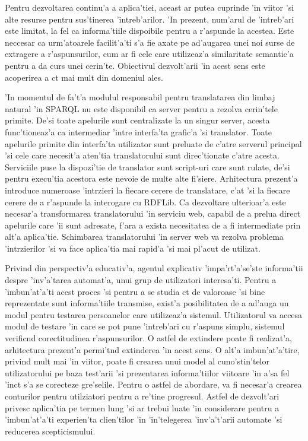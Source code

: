 \documentclass[12pt,a4paper,twoside]{report}
\begin{document}
Pentru dezvoltarea continu'a a aplica'tiei, aceast ar putea cuprinde 'in viitor 'si alte resurse pentru sus'tinerea 'intreb'arilor. 'In prezent, num'arul de 'intreb'ari este limitat, la fel ca informa'tiile dispoibile pentru a r'aspunde la acestea. Este neccesar ca urm'atoarele facilit'a'ti s'a fie axate pe ad'augarea unei noi surse de extragere a r'aspunsurilor, cum ar fi cele care utilizeaz'a similaritate semantic'a pentru a da curs unei cerin'te. Obiectivul dezvolt'arii 'in acest sens este acoperirea a c\ia t mai mult din domeniul ales.

'In momentul de fa't'a modulul responsabil pentru translatarea din limbaj natural 'in SPARQL nu este disponibil ca server pentru a rezolva cerin'tele primite. De'si toate apelurile sunt centralizate la un singur server, acesta func'tioneaz'a ca intermediar 'intre interfa'ta grafic'a 'si translator. Toate apelurile primite din interfa'ta utilizator sunt preluate de c'atre serverul principal 'si cele care necesit'a aten'tia translatorului sunt direc'tionate c'atre acesta. Serviciile puse la dispozi'tie de translator sunt script-uri care sunt rulate, de'si pentru execu'tia acestora este nevoie de multe alte fi'siere. Arhitectura prezent'a introduce numeroase 'int\ia rzieri la fiecare cerere de translatare, c'at 'si la fiecare cerere de a r'aspunde la interogare cu RDFLib. Ca dezvoltare ulterioar'a este necesar'a transformarea translatorului 'in serviciu web, capabil de a prelua direct apelurile care 'ii sunt adresate, f'ara a exista necesitatea de a fi intermediate prin alt'a aplica'tie. Schimbarea translatorului 'in server web va rezolva problema 'int\ia rzierilor 'si va face aplica'tia mai rapid'a 'si mai pl'acut de utilizat.
 
Privind din perspectiv'a educativ'a, agentul explicativ 'impa'rt'a'se'ste informa'tii despre 'inv'a'tarea automat'a, unui grup de utilizatori interesa'ti. Pentru a 'imbun'at'a'ti acest proces 'si pentru a se studia c\ia t de valoroase 'si bine reprezentate sunt informa'tiile transmise, exist'a posibilitatea de a ad'auga un modul pentru testarea persoanelor care utilizeaz'a sistemul. Utilizatorul va accesa modul de testare 'in care se pot pune 'intreb'ari cu r'aspuns simplu, sistemul verific\ia nd corectitudinea r'aspunsurilor. O astfel de extindere poate fi realizat'a, arhitectura prezent'a permi't\ia nd extinderea 'in acest sens. O alt'a imbun'at'a'tire, privind mult mai 'in viitor, poate fi crearea unui model al cuno'stin'telor utilizatorului pe baza test'arii 'si prezentarea informa'tiilor viitoare 'in a'sa fel 'inc\ia t s'a se corecteze gre'selile. Pentru o astfel de abordare, va fi necesar'a crearea conturilor pentru utilziatori pentru a re'tine progresul. Astfel de dezvolt'ari privesc aplica'tia pe termen lung 'si ar trebui luate 'in considerare pentru a 'imbun'at'a'ti experien'ta clien'tilor 'in 'in'telegerea 'inv'a't'arii automate 'si reducerea scepticismului. 


 


\end{document}
